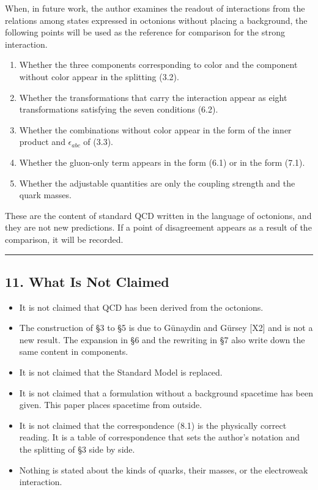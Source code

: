 \documentclass[
  a4paper,
]{article}
\providecommand{\tightlist}{%
  \setlength{\itemsep}{0pt}\setlength{\parskip}{0pt}}
\begin{document}
When, in future work, the author examines the readout of interactions
from the relations among states expressed in octonions without placing a
background, the following points will be used as the reference for
comparison for the strong interaction.

\begin{enumerate}
\def\labelenumi{\arabic{enumi}.}
\tightlist
\item
  Whether the three components corresponding to color and the component
  without color appear in the splitting (3.2).
\item
  Whether the transformations that carry the interaction appear as eight
  transformations satisfying the seven conditions (6.2).
\item
  Whether the combinations without color appear in the form of the inner
  product and \(\epsilon_{abc}\) of (3.3).
\item
  Whether the gluon-only term appears in the form (6.1) or in the form
  (7.1).
\item
  Whether the adjustable quantities are only the coupling strength and
  the quark masses.
\end{enumerate}

These are the content of standard QCD written in the language of
octonions, and they are not new predictions. If a point of disagreement
appears as a result of the comparison, it will be recorded.

\begin{center}\rule{0.5\linewidth}{0.5pt}\end{center}

\subsection{11. What Is Not Claimed}\label{what-is-not-claimed}

\begin{itemize}
\tightlist
\item
  It is not claimed that QCD has been derived from the octonions.
\item
  The construction of §3 to §5 is due to Günaydin and Gürsey {[}X2{]}
  and is not a new result. The expansion in §6 and the rewriting in §7
  also write down the same content in components.
\item
  It is not claimed that the Standard Model is replaced.
\item
  It is not claimed that a formulation without a background spacetime
  has been given. This paper places spacetime from outside.
\item
  It is not claimed that the correspondence (8.1) is the physically
  correct reading. It is a table of correspondence that sets the
  author's notation and the splitting of §3 side by side.
\item
  Nothing is stated about the kinds of quarks, their masses, or the
  electroweak interaction.
\end{itemize}
\end{document}
